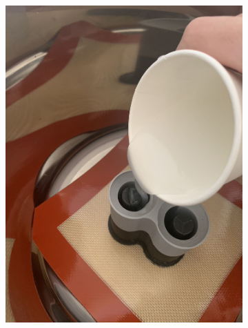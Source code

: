 \documentclass[twoside]{article}
\begin{document}
\begin{figure}[H]
	\begin{subfigure}[b]{0.33\linewidth}
		\centering
		\includegraphics[width=\textwidth]{pour}
	\end{subfigure}%
	\begin{subfigure}[b]{0.33\linewidth}
		\centering		

\end{subfigure}
\end{figure}
\end{document}
